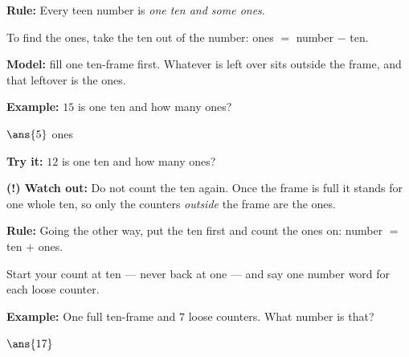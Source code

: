 \documentclass[12pt]{article}
\begin{document}


\begin{formulabox}
\textbf{Rule:} Every teen number is \emph{one ten and some ones}.\par
To find the ones, take the ten out of the number: \quad ones $=$ number $-$ ten.\par
\textbf{Model:} fill one ten-frame first. Whatever is left over sits outside the frame, and that leftover is the ones.
\end{formulabox}

\begin{examplebox}
\textbf{Example:} \quad $15$ is one ten and how many ones?

$\ans{5}$ ones
\end{examplebox}

\begin{tryitbox}
\textbf{Try it:} \quad $12$ is one ten and how many ones?\\[2pt]
\end{tryitbox}

\begin{watchoutbox}
\textbf{(!) Watch out:} Do not count the ten again. Once the frame is full it stands for one whole ten, so only the counters \emph{outside} the frame are the ones.
\end{watchoutbox}


\begin{formulabox}
\textbf{Rule:} Going the other way, put the ten first and count the ones on: \quad number $=$ ten $+$ ones.\par
Start your count at ten --- never back at one --- and say one number word for each loose counter.
\end{formulabox}

\begin{examplebox}
\textbf{Example:} \quad One full ten-frame and $7$ loose counters. What number is that?

$\ans{17}$
\end{examplebox}
\end{document}
